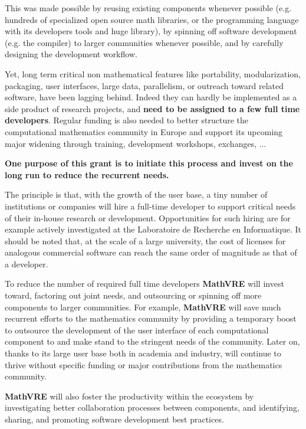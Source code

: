 \documentclass[a4paper,11pt]{article}
\newcommand{\XX}{\textbf{MathVRE}\xspace}
\newcommand{\TheProject}{\XX}
\begin{document}
This was made possible by reusing existing components whenever
possible (e.g. hundreds of specialized open source math libraries, or
the \Python programming language with its developers tools and huge
library), by spinning off software development (e.g. the \Cython
compiler) to larger communities whenever possible, and by carefully
designing the development workflow.

Yet, long term critical non mathematical features like portability,
modularization, packaging, user interfaces, large data, parallelism,
or outreach toward related software, have been lagging behind. Indeed
they can hardly be implemented as a side product of research projects,
and \textbf{need to be assigned to a few full time developers}. Regular
funding is also needed to better structure the computational
mathematics community in Europe and support its upcoming major
widening through training, development workshops, exchanges, ...

\textbf{One purpose of this grant is to initiate this process and
  invest on the long run to reduce the recurrent needs.}

The principle is that, with the growth of the user base, a tiny number
of institutions or companies will hire a full-time developer to
support critical needs of their in-house research or development.
Opportunities for such hiring are for example actively investigated at
the Laboratoire de Recherche en Informatique. It should be noted that,
at the scale of a large university, the cost of licenses for analogous
commercial software can reach the same order of magnitude as that of a
developer.


To reduce the number of required full time developers \TheProject will
invest toward, factoring out joint needs, and outsourcing or spinning
off more components to larger communities.
%
For example, \TheProject will save much recurrent efforts to the
mathematics community by providing a temporary boost to outsource the
development of the user interface of each computational component to
\IPython and make \IPython stand to the stringent needs of the
community.  Later on, thanks to its large user base both in academia
and industry, \IPython will continue to thrive without specific
funding or major contributions from the mathematics community.

\TheProject will also foster the productivity within the ecosystem by
investigating better collaboration processes between components, and
identifying, sharing, and promoting software development best
practices.
\end{document}
